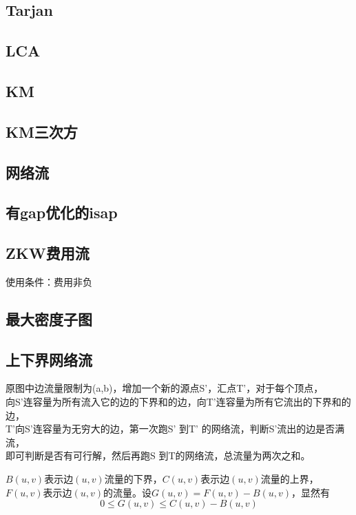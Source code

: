 \documentclass[landscape,a4paper]{article}
\begin{document}
\begin{spacing}{0.3}
\begin{multicols}{2}
		\subsection{Tarjan}
		
		\subsection{LCA}
		
		\subsection{KM}
		
		\subsection{KM三次方}
		
		\subsection{网络流}
		
		\subsection{有gap优化的isap}
		
		\subsection{ZKW费用流}
		使用条件：费用非负
		
		\subsection{最大密度子图}
		
			\subsection{上下界网络流}
原图中边流量限制为(a,b)，增加一个新的源点S’，汇点T’，对于每个顶点，\\
向S’连容量为所有流入它的边的下界和的边，向T’连容量为所有它流出的下界和的边，\\
T’向S’连容量为无穷大的边，第一次跑S’ 到T’ 的网络流，判断S’流出的边是否满流，\\
即可判断是否有可行解，然后再跑S 到T的网络流，总流量为两次之和。

$B(u,v)$表示边$(u,v)$流量的下界，$C(u,v)$表示边$(u,v)$流量的上界，$F(u,v)$表示边$(u,v)$的流量。设$G(u,v) = F(u,v) - B(u,v)$，显然有
	$$0 \leq G(u,v) \leq C(u,v)-B(u,v)$$


\end{multicols}
\end{spacing}
\end{document}
